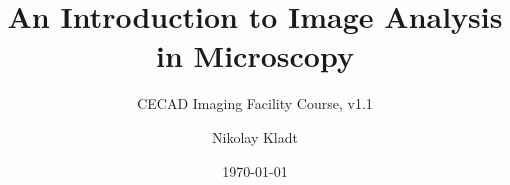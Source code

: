 \documentclass[12pt,twoside, parskip=half, headsepline=on, chapterprefix=true, draft=off]{scrbook}
\begin{document}
\title{An Introduction to Image Analysis in Microscopy}
\subtitle{CECAD Imaging Facility Course, v1.1} 
\author{Nikolay Kladt}
\date{\today}
\publishers{Imaging Facility\\Cluster of Excellence -- Cellular Stress Responses in Aging-Associated Diseases\\University of Cologne}

\maketitle

\tableofcontents




%
\end{document}
